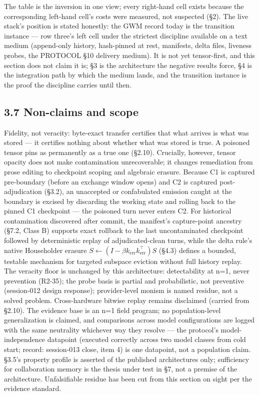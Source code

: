 \documentclass[11pt]{article}
\begin{document}
The table is the inversion in one view; every right-hand cell exists because the corresponding left-hand cell's costs were measured, not suspected (\S{}2). The live stack's position is stated honestly: the GWM record today is the transition instance --- row three's left cell under the strictest discipline available on a text medium (append-only history, hash-pinned at rest, manifests, delta files, liveness probes, the PROTOCOL \S{}10 delivery medium). It is not yet tensor-first, and this section does not claim it is; \S{}3 is the architecture the negative results force, \S{}4 is the integration path by which the medium lands, and the transition instance is the proof the discipline carries until then.

\subsection{3.7 Non-claims and scope}\label{non-claims-and-scope-1}

Fidelity, not veracity: byte-exact transfer certifies that what arrives is what was stored --- it certifies nothing about whether what was stored is true. A poisoned tensor pins as permanently as a true one (\S{}2.10). Crucially, however, tensor opacity does not make contamination unrecoverable; it changes remediation from prose editing to checkpoint scoping and algebraic erasure. Because C1 is captured pre-boundary (before an exchange window opens) and C2 is captured post-adjudication (\S{}3.2), an unaccepted or confabulated emission caught at the boundary is excised by discarding the working state and rolling back to the pinned C1 checkpoint --- the poisoned turn never enters C2. For historical contamination discovered after commit, the manifest's capture-point ancestry (\S{}7.2, Class B) supports exact rollback to the last uncontaminated checkpoint followed by deterministic replay of adjudicated-clean turns, while the delta rule's native Householder erasure \(S \leftarrow (I - \beta k_{\text{err}} k_{\text{err}}^{\top}) S\) (\S{}4.3) defines a bounded, testable mechanism for targeted subspace eviction without full history replay. The veracity floor is unchanged by this architecture: detectability at n=1, never prevention (R2-35); the probe basis is partial and probabilistic, not preventive (session-012 design response); provider-level monism is named residue, not a solved problem. Cross-hardware bitwise replay remains disclaimed (carried from \S{}2.10). The evidence base is an n=1 field program; no population-level generalization is claimed, and comparisons across model configurations are logged with the same neutrality whichever way they resolve --- the protocol's model-independence datapoint (executed correctly across two model classes from cold start; record: session-013 close, item 4) is one datapoint, not a population claim. \S{}3.5's property profile is asserted of the published architectures only; sufficiency for collaboration memory is the thesis under test in \S{}7, not a premise of the architecture. Unfalsifiable residue has been cut from this section on sight per the evidence standard.
\end{document}
